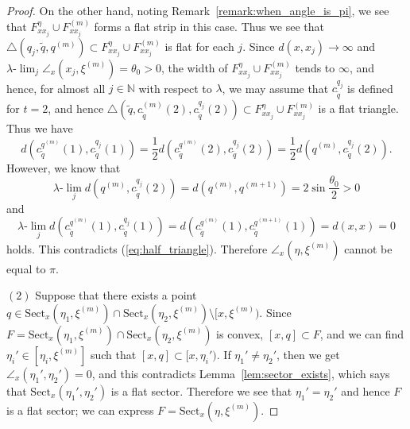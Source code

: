 \documentclass[12pt]{amsart}
\numberwithin{equation}{section}
\theoremstyle{plain}
\theoremstyle{definition}
\theoremstyle{remark}
\newcommand{\N}{{\mathbb N}}
\newcommand{\ulim}{\lambda{\text{-}}\!\lim}
\newcommand{\q}[1]{q^{(#1)}}
\newcommand{\xxi}[1]{\xi^{(#1)}}
\newcommand{\ray}[1]{[#1)}
\newcommand{\cc}[2]{c_{#1}^{#2}}
\newcommand{\tri}[3]{\triangle(#1,#2,#3)}
\newcommand{\sect}[3][]{\mathrm{Sect}_{#1}(#2,#3)}
\newcommand{\zure}{\theta_0}
\begin{document}
\begin{proof}
 On the other hand, noting Remark~\ref{remark:when_angle_is_pi}, 
 we see that $F_{xx_j}^{\eta}\cup F_{xx_j}^{(m)}$ forms a flat strip in
 this case. 
 Thus we see that 
 $\tri{q_j}{\tilde q}{\q{m}}\subset F_{xx_j}^{\eta}\cup F_{xx_j}^{(m)}$
 is flat for each $j$. 
 Since $d(x,x_j)\to \infty$ and 
 $\ulim_j \angle_{x}(x_j,\xxi{m})=\zure>0$, the width of 
 $F_{xx_j}^{\eta}\cup F_{xx_j}^{(m)}$ tends to $\infty$, and hence, 
 for almost all $j \in \N$ with respect to $\lambda$, we may assume that 
 $\cc{\tilde q}{q_j}$ is defined for $t=2$, and hence
 $\tri{\tilde q}{\cc{\tilde q}{(m)}(2)}{\cc{\tilde q}{q_j}(2)} 
 \subset F_{xx_j}^{\eta}\cup F_{xx_j}^{(m)}$ 
 is a flat triangle. 
 Thus we have
\begin{equation}
\label{eq:half_triangle}
 d(\cc{\tilde q}{\q{m}}(1), \cc{\tilde q}{q_j}(1)) =
 \frac{1}{2}d(\cc{\tilde q}{\q{m}}(2), \cc{\tilde q}{q_j}(2))
 = \frac{1}{2}d(\q{m},\cc{\tilde q}{q_j}(2)). 
\end{equation}
 However, we know that 
\begin{equation*}
 \ulim_j d(\q{m},\cc{\tilde q}{q_j}(2))= 
 d(\q{m},\q{m+1})=2 \sin \frac{\zure}{2} > 0
\end{equation*}
 and 
\begin{equation*}
 \ulim_j d(\cc{\tilde q}{\q{m}}(1), \cc{\tilde q}{q_j}(1))
  = d(\cc{\tilde q}{\q{m}}(1), \cc{\tilde q}{\q{m+1}}(1)) 
  =d (x,x)=0
\end{equation*}
 holds.  This contradicts (\ref{eq:half_triangle}). 
 Therefore $\angle_{x}(\eta,\xxi{m})$ cannot be equal to $\pi$. 

$(2)$ Suppose that there exists a point 
 $q \in \sect[x]{\eta_1}{\xxi{m}}\cap \sect[x]{\eta_2}{\xxi{m}}
 \setminus \ray{x,\xxi{m}}$. 
 Since 
 $F=\sect[x]{\eta_1}{\xxi{m}}\cap \sect[x]{\eta_2}{\xxi{m}}$ is
 convex, $[x,q] \subset F$, and we can find 
 $\eta_i' \in [\eta_i,\xxi{m}]$ such that 
 $[x,q]\subset \ray{x,\eta_i'}$. 
 If $\eta_1'\not=\eta_2'$, then we get
 $\angle_{x}(\eta_1',\eta_2')=0$, and this contradicts
 Lemma~\ref{lem:sector_exists}, which says that 
 $\sect[x]{\eta_1'}{\eta_2'}$ is a flat sector. 
 Therefore we see that $\eta_1'=\eta_2'$ and hence 
 $F$ is a flat sector; we can express
 $F=\sect[x]{\eta}{\xxi{m}}$. 
 

\end{proof}
\end{document}
